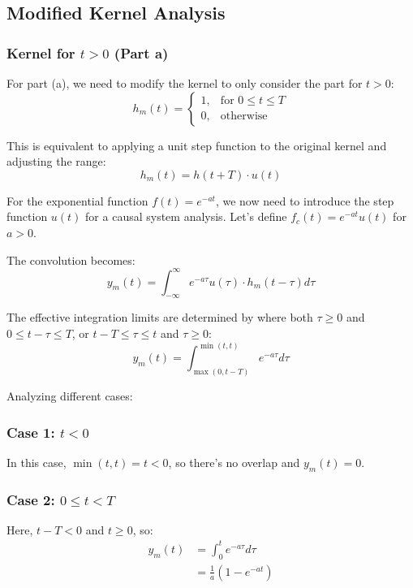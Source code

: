 	\subsection{Modified Kernel Analysis}
	\subsubsection{Kernel for $t > 0$ (Part a)}
	For part (a), we need to modify the kernel to only consider the part for $t > 0$:
	\begin{equation}
		h_m(t) = 
		\begin{cases} 
			1, & \text{for } 0 \leq t \leq T \\
			0, & \text{otherwise}
		\end{cases}
	\end{equation}
	
	This is equivalent to applying a unit step function to the original kernel and adjusting the range:
	\begin{equation}
		h_m(t) = h(t+T) \cdot u(t)
	\end{equation}
	
	For the exponential function $f(t) = e^{-at}$, we now need to introduce the step function $u(t)$ for a causal system analysis. Let's define $f_c(t) = e^{-at}u(t)$ for $a > 0$.
	
	The convolution becomes:
	\begin{equation}
		y_m(t) = \int_{-\infty}^{\infty} e^{-a\tau}u(\tau) \cdot h_m(t - \tau) d\tau
	\end{equation}
	
	The effective integration limits are determined by where both $\tau \geq 0$ and $0 \leq t - \tau \leq T$, or $t - T \leq \tau \leq t$ and $\tau \geq 0$:
	\begin{equation}
		y_m(t) = \int_{\max(0, t-T)}^{\min(t, t)} e^{-a\tau} d\tau
	\end{equation}
	
	Analyzing different cases:
	
	\subsubsection{Case 1: $t < 0$}
	In this case, $\min(t, t) = t < 0$, so there's no overlap and $y_m(t) = 0$.
	
	\subsubsection{Case 2: $0 \leq t < T$}
	Here, $t - T < 0$ and $t \geq 0$, so:
	\begin{align}
		y_m(t) &= \int_{0}^{t} e^{-a\tau} d\tau \\
		&= \frac{1}{a}(1 - e^{-at})
	\end{align}
	
